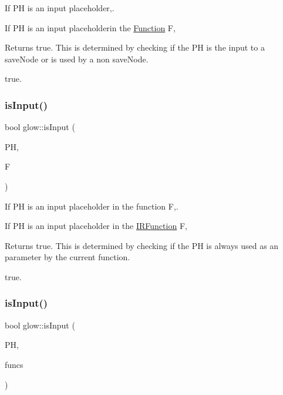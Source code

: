If {\ttfamily PH} is an input placeholder,. 

If {\ttfamily PH} is an input placeholderin the \hyperlink{classglow_1_1_function}{Function} {\ttfamily F}, \begin{DoxyReturn}{Returns}
true. This is determined by checking if the PH is the input to a save\+Node or is used by a non save\+Node.

true. 
\end{DoxyReturn}
\mbox{\label{namespaceglow_acb98192dd9bfc2315759db1806f01ad1}} 
\subsubsection{\texorpdfstring{is\+Input()}{isInput()}\hspace{0.1cm}{\footnotesize\ttfamily [2/3]}}
{\footnotesize\ttfamily bool glow\+::is\+Input (\begin{DoxyParamCaption}\item[{const \hyperlink{classglow_1_1_placeholder}{Placeholder} $\ast$}]{PH,  }\item[{const \hyperlink{classglow_1_1_i_r_function}{I\+R\+Function} \&}]{F }\end{DoxyParamCaption})}



If {\ttfamily PH} is an input placeholder in the function {\ttfamily F},. 

If {\ttfamily PH} is an input placeholder in the \hyperlink{classglow_1_1_i_r_function}{I\+R\+Function} {\ttfamily F}, \begin{DoxyReturn}{Returns}
true. This is determined by checking if the PH is always used as an  parameter by the current function.

true. 
\end{DoxyReturn}
\mbox{\label{namespaceglow_aac10131240fff18a61a4f525541fe765}} 
\subsubsection{\texorpdfstring{is\+Input()}{isInput()}\hspace{0.1cm}{\footnotesize\ttfamily [3/3]}}
{\footnotesize\ttfamily bool glow\+::is\+Input (\begin{DoxyParamCaption}\item[{const \hyperlink{classglow_1_1_placeholder}{Placeholder} $\ast$}]{PH,  }\item[{const std\+::vector$<$ const \hyperlink{classglow_1_1_function}{Function} $\ast$$>$ \&}]{funcs }\end{DoxyParamCaption})}

